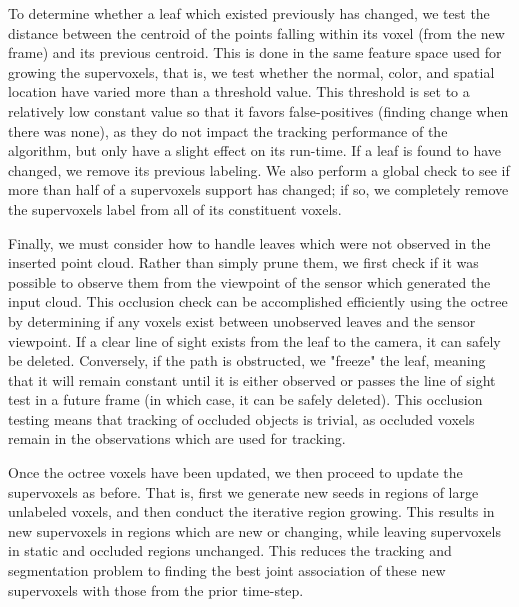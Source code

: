 To determine whether a leaf which existed previously has changed, we test the distance between the centroid of the points falling within its voxel (from the new frame) and its previous centroid. This is done in the same feature space used for growing the supervoxels, that is, we test whether the normal, color, and spatial location have varied more than a threshold value. This threshold is set to a relatively low constant value so that it favors false-positives (finding change when there was none), as they do not impact the tracking performance of the algorithm, but only have a slight effect on its run-time.  If a leaf is found to have changed, we remove its previous labeling. We also perform a global check to see if more than half of a supervoxels support has changed; if so, we completely remove the supervoxels label from all of its constituent voxels. 

Finally, we must consider how to handle leaves which were not observed in the inserted point cloud. Rather than simply prune them, we first check if it was possible to observe them from the viewpoint of the sensor which generated the input cloud. This occlusion check can be accomplished efficiently using the octree by determining if any voxels exist between unobserved leaves and the sensor viewpoint. If a clear line of sight exists from the leaf to the camera, it can safely be deleted. Conversely, if the path is obstructed, we "freeze" the leaf, meaning that it will remain constant until it is either observed or passes the line of sight test in a future frame (in which case, it can be safely deleted). This occlusion testing means that tracking of occluded objects is trivial, as occluded voxels remain in the observations which are used for tracking.

Once the octree voxels have been updated, we then proceed to update the supervoxels as before. That is, first we generate new seeds in regions of large unlabeled voxels, and then conduct the iterative region growing. This results in new supervoxels in regions which are new or changing, while leaving supervoxels in static and occluded regions unchanged. This reduces the tracking and segmentation problem to finding the best joint association of these new supervoxels with those from the prior time-step.

